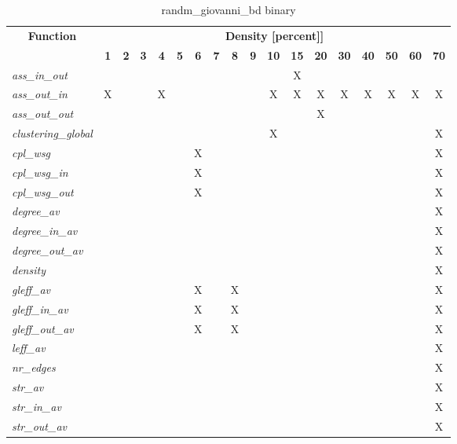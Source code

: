 \begin{table}[h] \centering \begin{tabular}{|l|c|c|c|c|c|c|c|c|c|c|c|c|c|c|c|c|c|} \hline\multicolumn{1}{|c|}{\textbf{\large{Function}}} & \multicolumn{17}{c|}{\large{\textbf{Density [percent]]}}}\\\cline{2-18}  & \textbf{1} &  \textbf{2} &  \textbf{3} &  \textbf{4} &  \textbf{5} &  \textbf{6} &  \textbf{7} &  \textbf{8} &  \textbf{9} &  \textbf{10} &  \textbf{15} &  \textbf{20} &  \textbf{30} &  \textbf{40} &  \textbf{50} &  \textbf{60} &  \textbf{70} \\ \hline   \textit{ass\_in\_out} &   &   &   &   &   &   &   &   &   &   & X &   &   &   &   &   &   \\ \hline  \textit{ass\_out\_in} & X &   &   & X &   &   &   &   &   & X & X & X & X & X & X & X & X \\ \hline  \textit{ass\_out\_out} &   &   &   &   &   &   &   &   &   &   &   & X &   &   &   &   &   \\ \hline  \textit{clustering\_global} &   &   &   &   &   &   &   &   &   & X &   &   &   &   &   &   & X \\ \hline  \textit{cpl\_wsg} &   &   &   &   &   & X &   &   &   &   &   &   &   &   &   &   & X \\ \hline  \textit{cpl\_wsg\_in} &   &   &   &   &   & X &   &   &   &   &   &   &   &   &   &   & X \\ \hline  \textit{cpl\_wsg\_out} &   &   &   &   &   & X &   &   &   &   &   &   &   &   &   &   & X \\ \hline  \textit{degree\_av} &   &   &   &   &   &   &   &   &   &   &   &   &   &   &   &   & X \\ \hline  \textit{degree\_in\_av} &   &   &   &   &   &   &   &   &   &   &   &   &   &   &   &   & X \\ \hline  \textit{degree\_out\_av} &   &   &   &   &   &   &   &   &   &   &   &   &   &   &   &   & X \\ \hline  \textit{density} &   &   &   &   &   &   &   &   &   &   &   &   &   &   &   &   & X \\ \hline  \textit{gleff\_av} &   &   &   &   &   & X &   & X &   &   &   &   &   &   &   &   & X \\ \hline  \textit{gleff\_in\_av} &   &   &   &   &   & X &   & X &   &   &   &   &   &   &   &   & X \\ \hline  \textit{gleff\_out\_av} &   &   &   &   &   & X &   & X &   &   &   &   &   &   &   &   & X \\ \hline  \textit{leff\_av} &   &   &   &   &   &   &   &   &   &   &   &   &   &   &   &   & X \\ \hline  \textit{nr\_edges} &   &   &   &   &   &   &   &   &   &   &   &   &   &   &   &   & X \\ \hline  \textit{str\_av} &   &   &   &   &   &   &   &   &   &   &   &   &   &   &   &   & X \\ \hline  \textit{str\_in\_av} &   &   &   &   &   &   &   &   &   &   &   &   &   &   &   &   & X \\ \hline  \textit{str\_out\_av} &   &   &   &   &   &   &   &   &   &   &   &   &   &   &   &   & X \\ \hline \end{tabular}\caption{randm\_giovanni\_bd binary}\label{tab:my_label} \end{table}